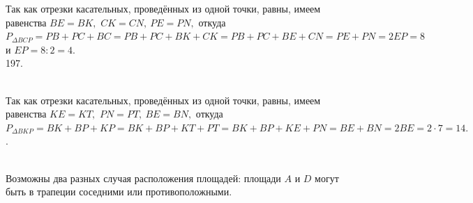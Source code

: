 \documentclass[12pt]{article}
\begin{document}
Так как отрезки касательных, проведённых из одной точки, равны, имеем равенства $BE=BK,$ $CK=CN,\ PE=PN,$ откуда $P_{\Delta BCP}=PB+PC+BC=PB+PC+BK+CK=
PB+PC+BE+CN=PE+PN=2EP=8$ и $EP=8:2=4.$\\
197. \begin{figure}[ht!]
\end{figure}\\
Так как отрезки касательных, проведённых из одной точки, равны, имеем равенства $KE=KT,$ $PN=PT,\ BE=BN,$ откуда $P_{\Delta BKP}=BK+BP+KP=BK+BP+KT+PT=
BK+BP+KE+PN=BE+BN=2BE=2\cdot7=14.$\newpage{}. \begin{figure}[ht!]
\end{figure}\\
Возможны два разных случая расположения площадей: площади $A$ и $D$ могут быть в трапеции соседними или противоположными.
\end{document}
